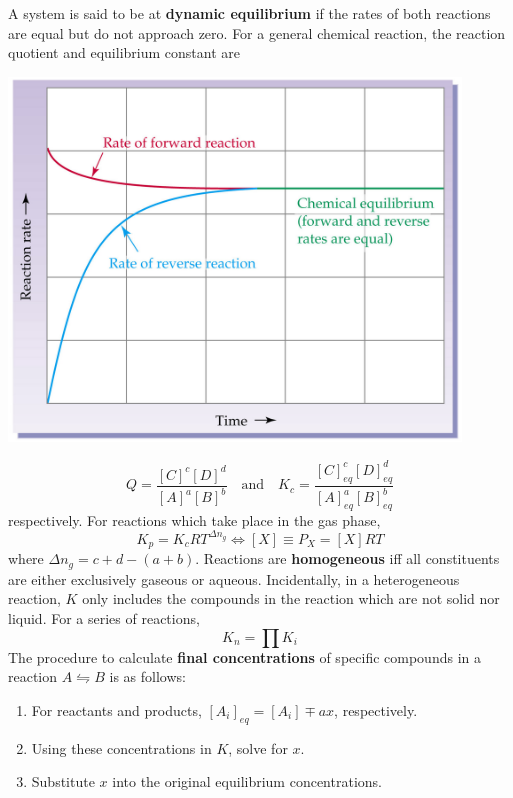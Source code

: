 \documentclass{tufte-book}
\renewcommand{\emph}[1]{\textbf{#1}}
\begin{document}
A system is said to be at \emph{dynamic equilibrium} if the rates of both reactions are equal but do not approach zero. For a general chemical reaction, the reaction quotient and equilibrium constant are
%
\begin{marginfigure}[5mm]
\begin{center}
  \includegraphics[width=0.9\textwidth]{equilibrium} \phantom{m}
\end{center}
\end{marginfigure}
%
\begin{equation}
  Q = \frac{[C]^c [D]^d}{[A]^a [B]^b} \quad\text{and}\quad K_c = \frac{[C]^c_{eq} [D]^d_{eq}}{[A]^a_{eq} [B]^b_{eq}}
\end{equation}
respectively. For reactions which take place in the gas phase, \begin{equation}
  K_p = K_c RT^{\Delta n_g} \iff [X] \equiv P_X = [X]RT
\end{equation}
where $\Delta n_g = c+d-(a+b)$. Reactions are \emph{homogeneous} iff all constituents are either exclusively gaseous or aqueous. Incidentally, in a heterogeneous reaction, $K$ only includes the compounds in the reaction which are not solid nor liquid. For a series of reactions, \begin{equation}
  K_n = \prod K_i
\end{equation}
The procedure to calculate \emph{final concentrations} of specific compounds in a reaction $A \leftrightharpoons B$ is as follows:
\begin{enumerate}
  \item For reactants and products, $[A_i]_{eq} = [A_i] \mp ax$, respectively.
  \item Using these concentrations in $K$, solve for $x$.
  \item Substitute $x$ into the original equilibrium concentrations.
\end{enumerate}
\end{document}

